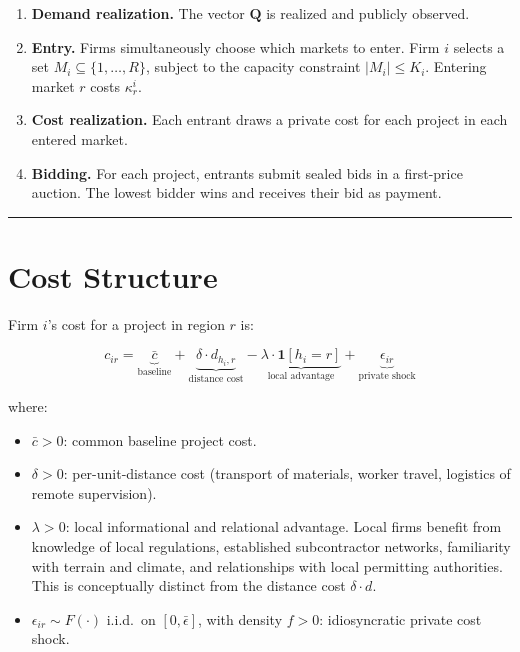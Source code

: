 \documentclass[10pt]{article}
\begin{document}
\begin{enumerate}
  \item \textbf{Demand realization.} The vector $\mathbf{Q}$ is realized and publicly observed.
  \item \textbf{Entry.} Firms simultaneously choose which markets to enter. Firm $i$ selects a set $M_i \subseteq \{1, \dots, R\}$, subject to the capacity constraint $|M_i| \leq K_i$. Entering market $r$ costs $\kappa_r^i$.
  \item \textbf{Cost realization.} Each entrant draws a private cost for each project in each entered market.
  \item \textbf{Bidding.} For each project, entrants submit sealed bids in a first-price auction. The lowest bidder wins and receives their bid as payment.
\end{enumerate}

\bigskip\hrule\bigskip

\section{Cost Structure}

Firm $i$'s cost for a project in region $r$ is:

\[
  c_{ir} = \underbrace{\bar{c}}_{\text{baseline}}
         + \underbrace{\delta \cdot d_{h_i, r}}_{\text{distance cost}}
         - \underbrace{\lambda \cdot \mathbf{1}[h_i = r]}_{\text{local advantage}}
         + \underbrace{\epsilon_{ir}}_{\text{private shock}}
\]

where:
\begin{itemize}
  \item $\bar{c} > 0$: common baseline project cost.
  \item $\delta > 0$: per-unit-distance cost (transport of materials, worker travel, logistics of remote supervision).
  \item $\lambda > 0$: local informational and relational advantage. Local firms benefit from knowledge of local regulations, established subcontractor networks, familiarity with terrain and climate, and relationships with local permitting authorities. This is conceptually distinct from the distance cost $\delta \cdot d$.
  \item $\epsilon_{ir} \sim F(\cdot)$ i.i.d.\ on $[0, \bar{\epsilon}]$, with density $f > 0$: idiosyncratic private cost shock.
\end{itemize}
\end{document}
